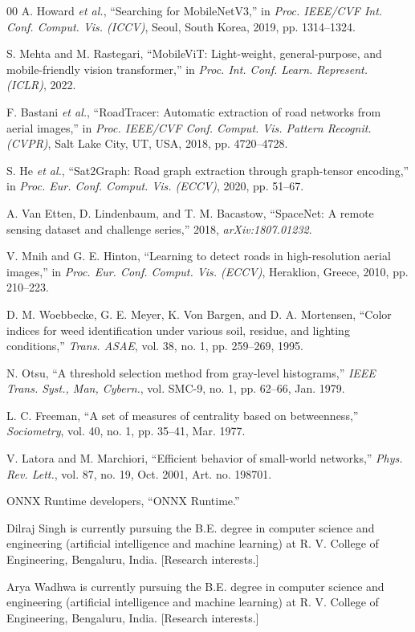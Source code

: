 \documentclass{ieeeaccess}
\begin{document}
\begin{thebibliography}{00}
A. Howard \emph{et al.},
``Searching for MobileNetV3,''
in \emph{Proc. IEEE/CVF Int. Conf. Comput. Vis. (ICCV)},
Seoul, South Korea, 2019, pp. 1314--1324.

S. Mehta and M. Rastegari,
``MobileViT: Light-weight, general-purpose, and mobile-friendly vision transformer,''
in \emph{Proc. Int. Conf. Learn. Represent. (ICLR)},
2022.

F. Bastani \emph{et al.},
``RoadTracer: Automatic extraction of road networks from aerial images,''
in \emph{Proc. IEEE/CVF Conf. Comput. Vis. Pattern Recognit. (CVPR)},
Salt Lake City, UT, USA, 2018, pp. 4720--4728.

S. He \emph{et al.},
``Sat2Graph: Road graph extraction through graph-tensor encoding,''
in \emph{Proc. Eur. Conf. Comput. Vis. (ECCV)},
2020, pp. 51--67.

A. Van Etten, D. Lindenbaum, and T. M. Bacastow,
``SpaceNet: A remote sensing dataset and challenge series,''
2018, \emph{arXiv:1807.01232}.

V. Mnih and G. E. Hinton,
``Learning to detect roads in high-resolution aerial images,''
in \emph{Proc. Eur. Conf. Comput. Vis. (ECCV)},
Heraklion, Greece, 2010, pp. 210--223.

D. M. Woebbecke, G. E. Meyer, K. Von Bargen, and D. A. Mortensen,
``Color indices for weed identification under various soil, residue, and lighting conditions,''
\emph{Trans. ASAE}, vol. 38, no. 1, pp. 259--269, 1995.

N. Otsu,
``A threshold selection method from gray-level histograms,''
\emph{IEEE Trans. Syst., Man, Cybern.}, vol. SMC-9, no. 1, pp. 62--66,
Jan. 1979.

L. C. Freeman,
``A set of measures of centrality based on betweenness,''
\emph{Sociometry}, vol. 40, no. 1, pp. 35--41,
Mar. 1977.

V. Latora and M. Marchiori,
``Efficient behavior of small-world networks,''
\emph{Phys. Rev. Lett.}, vol. 87, no. 19, Oct. 2001,
Art. no. 198701.

ONNX Runtime developers,
``ONNX Runtime.''

\end{thebibliography}

\begin{IEEEbiography}{Dilraj Singh}
is currently pursuing the B.E. degree in computer science and engineering
(artificial intelligence and machine learning) at R. V. College of Engineering,
Bengaluru, India. [Research interests.]
\end{IEEEbiography}

\begin{IEEEbiography}{Arya Wadhwa}
is currently pursuing the B.E. degree in computer science and engineering
(artificial intelligence and machine learning) at R. V. College of Engineering,
Bengaluru, India. [Research interests.]
\end{IEEEbiography}

\EOD
\end{document}

